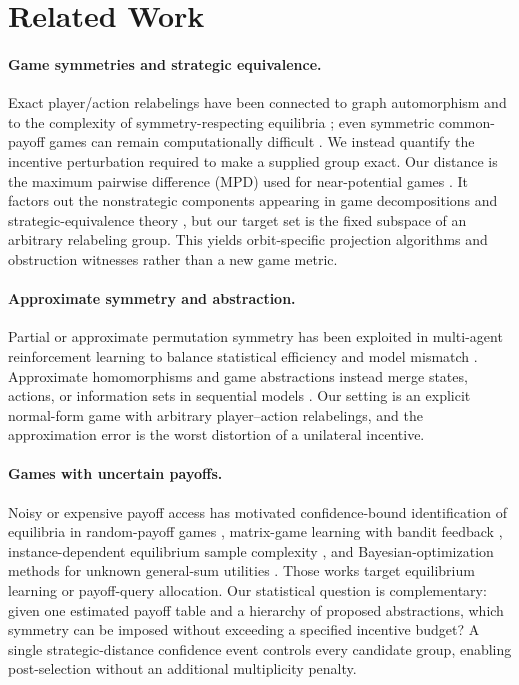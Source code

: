 \section{Related Work}

\paragraph{Game symmetries and strategic equivalence.}
Exact player/action relabelings have been connected to graph automorphism and to the complexity of symmetry-respecting equilibria \cite{tewolde2025game}; even symmetric common-payoff games can remain computationally difficult \cite{ghosh2026complexity}.  We instead quantify the incentive perturbation required to make a supplied group exact.  Our distance is the maximum pairwise difference (MPD) used for near-potential games \cite{candogan2013near}.  It factors out the nonstrategic components appearing in game decompositions and strategic-equivalence theory \cite{candogan2011flows,hwang2020strategic}, but our target set is the fixed subspace of an arbitrary relabeling group.  This yields orbit-specific projection algorithms and obstruction witnesses rather than a new game metric.

\paragraph{Approximate symmetry and abstraction.}
Partial or approximate permutation symmetry has been exploited in multi-agent reinforcement learning to balance statistical efficiency and model mismatch \cite{yu2024partial,yardim2025approximately}.  Approximate homomorphisms and game abstractions instead merge states, actions, or information sets in sequential models \cite{ravindran2004mdp,gilpin2007lossless,kroer2014extensive,ishibashi2025approximate}.  Our setting is an explicit normal-form game with arbitrary player--action relabelings, and the approximation error is the worst distortion of a unilateral incentive.

\paragraph{Games with uncertain payoffs.}
Noisy or expensive payoff access has motivated confidence-bound identification of equilibria in random-payoff games \cite{zhou2017identify}, matrix-game learning with bandit feedback \cite{odonoghue2021matrix}, instance-dependent equilibrium sample complexity \cite{maiti2023instance}, and Bayesian-optimization methods for unknown general-sum utilities \cite{tay2023noregret}.  Those works target equilibrium learning or payoff-query allocation.  Our statistical question is complementary: given one estimated payoff table and a hierarchy of proposed abstractions, which symmetry can be imposed without exceeding a specified incentive budget?  A single strategic-distance confidence event controls every candidate group, enabling post-selection without an additional multiplicity penalty.

